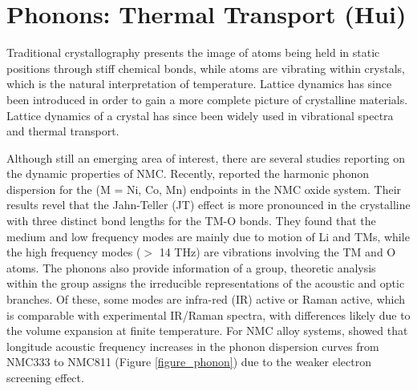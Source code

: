 \documentclass[journal=jacsat,manuscript=article]{achemso}
\begin{document}
\clearpage

\section{Phonons: Thermal Transport (Hui)}
Traditional crystallography presents the image of atoms being held in static positions through stiff chemical bonds, while atoms are vibrating within crystals, which is the natural interpretation of temperature. Lattice dynamics has since been introduced in order to gain a more complete picture of crystalline materials. Lattice dynamics of a crystal has since been widely used in vibrational spectra and thermal transport.

Although still an emerging area of interest, there are several studies reporting on the dynamic properties of NMC. Recently, \citeauthor{yang2020chemical} reported the harmonic phonon dispersion for the  (M = Ni, Co, Mn) endpoints in the NMC oxide system. \cite{yang2020chemical} Their results revel that the Jahn-Teller (JT) effect is more pronounced in the crystalline  with three distinct bond lengths for the TM-O bonds. They found that the medium and low frequency modes are mainly due to motion of Li and TMs, while the high frequency modes ($>$ 14 THz) are vibrations involving the TM and O atoms. The phonons also provide information of a group, theoretic analysis within the group assigns the irreducible representations of the acoustic and optic branches. Of these, some modes are infra-red (IR) active or Raman active, which is comparable with experimental IR/Raman spectra, with differences likely due to the volume expansion at finite temperature. \cite{yang2019highly} For NMC alloy systems, \citeauthor{sun_electronic_2017} showed that longitude acoustic frequency increases in the phonon dispersion curves from NMC333 to NMC811 (Figure \ref{figure_phonon}) due to the weaker electron screening effect.\cite{sun_electronic_2017}
\end{document}
